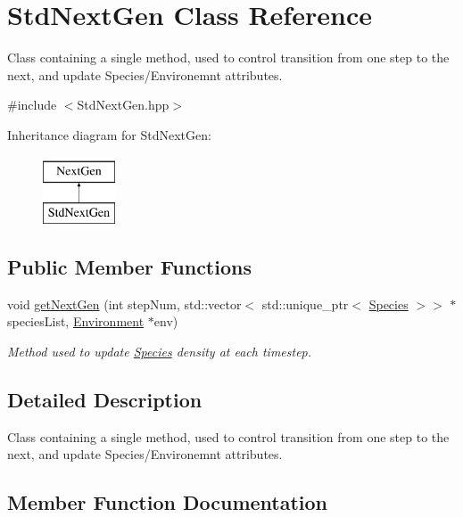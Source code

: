 \hypertarget{classStdNextGen}{}\section{Std\+Next\+Gen Class Reference}
\label{classStdNextGen}


Class containing a single method, used to control transition from one step to the next, and update Species/\+Environemnt attributes.  




{\ttfamily \#include $<$Std\+Next\+Gen.\+hpp$>$}

Inheritance diagram for Std\+Next\+Gen\+:\begin{figure}[H]
\begin{center}
\leavevmode
\includegraphics[height=2.000000cm]{classStdNextGen}
\end{center}
\end{figure}
\subsection*{Public Member Functions}
\begin{DoxyCompactItemize}
\item 
void \hyperlink{classStdNextGen_a2253fef9e33f6fe5f2e84f4dc89cfcd2}{get\+Next\+Gen} (int step\+Num, std\+::vector$<$ std\+::unique\+\_\+ptr$<$ \hyperlink{classSpecies}{Species} $>$$>$ $\ast$species\+List, \hyperlink{classEnvironment}{Environment} $\ast$env)
\begin{DoxyCompactList}\small\item\em Method used to update \hyperlink{classSpecies}{Species} density at each timestep. \end{DoxyCompactList}\end{DoxyCompactItemize}


\subsection{Detailed Description}
Class containing a single method, used to control transition from one step to the next, and update Species/\+Environemnt attributes. 

\subsection{Member Function Documentation}
\mbox{\label{classStdNextGen_a2253fef9e33f6fe5f2e84f4dc89cfcd2}} 
